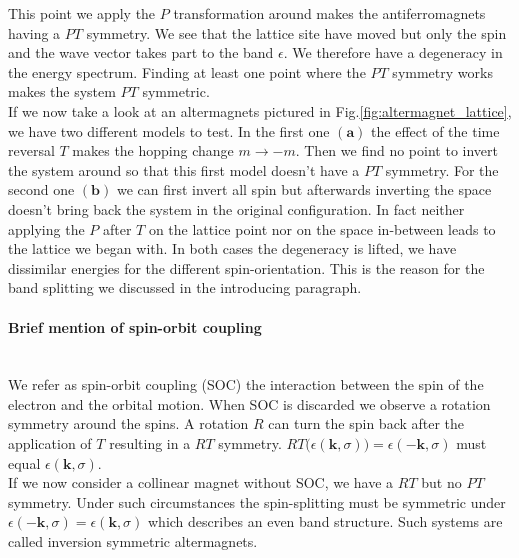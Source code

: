 \documentclass[../main.tex]{main.tex}
\begin{document}
This point we apply the $P$ transformation around makes the antiferromagnets having a $PT$ symmetry. We see that the lattice site have moved but only the spin and
the wave vector takes part to the band $\epsilon$. We therefore have a degeneracy in the energy spectrum. Finding at least one point where the $PT$ 
symmetry works makes the system $PT$ symmetric.\\

If we now take a look at an altermagnets pictured in Fig.\ref{fig:altermagnet_lattice}, we have two different models to test. In the first one $\bm{(a)}$
the effect of the time reversal $T$ makes the hopping change $m\rightarrow -m$. Then we find no point
to invert the system around so that this first model doesn't have a $PT$ symmetry. For the second one $\bm{(b)}$
we can first invert all spin but afterwards inverting the space doesn't bring back the system in the original configuration.
In fact neither applying the $P$ after $T$ on the lattice point nor on the space in-between leads to the lattice we began with. In both cases the 
degeneracy is lifted, we have dissimilar energies for the different spin-orientation. This is the reason for the band splitting we discussed in the introducing 
paragraph.\\

\paragraph{Brief mention of spin-orbit coupling} $~$ \\
We refer as spin-orbit coupling (SOC) the interaction between the spin of the electron and the orbital motion. 
When SOC is discarded we observe a rotation symmetry around the spins. A rotation $R$ can turn the spin back after the application of $T$
resulting in a $RT$ symmetry. $RT\bigl(\epsilon(\bm{k},\sigma)\bigr) = \epsilon(-\bm{k},\sigma)$ must equal $\epsilon(\bm{k},\sigma)$.\\

If we now consider a collinear magnet without SOC, we have a $RT$ but no $PT$ symmetry. Under such circumstances the spin-splitting must be symmetric under 
$\epsilon(-\bm{k},\sigma) = \epsilon(\bm{k},\sigma)$ which describes an even band structure. Such systems are called inversion symmetric altermagnets.\\
\end{document}
